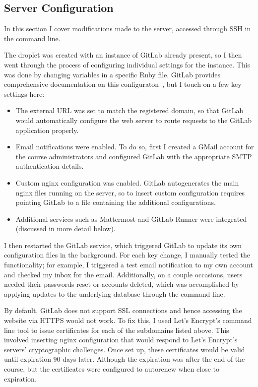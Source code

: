 \documentclass[12pt,twoside]{mitthesis}
\newcommand{\draft}[1]{{\color{blue} #1}}
\begin{document}
\subsection{Server Configuration}

\draft{In this section I cover modifications made to the server, accessed through SSH in the command line.

The droplet was created with an instance of GitLab already present, so I then went through the process of configuring individual settings for the instance. This was done by changing variables in a specific Ruby file. GitLab provides comprehensive documentation on this configuraton~\cite{gitlabdocs}, but I touch on a few key settings here:
\begin{itemize}
\item The external URL was set to match the registered domain, so that GitLab would automatically configure the web server to route requests to the GitLab application properly.
\item Email notifications were enabled. To do so, first I created a GMail account for the course administrators and configured GitLab with the appropriate SMTP authentication details. 
\item Custom nginx configuration was enabled. GitLab autogenerates the main nginx files running on the server, so to insert custom configuration requires pointing GitLab to a file containing the additional configurations.
\item Additional services such as Mattermost and GitLab Runner were integrated (discussed in more detail below).
\end{itemize}
I then restarted the GitLab service, which triggered GitLab to update its own configuration files in the background. For each key change, I manually tested the functionality; for example, I triggered a test email notification to my own account and checked my inbox for the email. Additionally, on a couple occasions, users needed their passwords reset or accounts deleted, which was accomplished by applying updates to the underlying database through the command line.

By default, GitLab does not support SSL connections and hence accessing the website via HTTPS would not work. To fix this, I used Let's Encrypt's command line tool to issue certificates for each of the subdomains listed above. This involved inserting nginx configuration that would respond to Let's Encrypt's servers' cryptographic challenges. Once set up, these certificates would be valid until expiration 90 days later. Although the expiration was after the end of the course, but the certificates were configured to autorenew when close to expiration. 

}
\end{document}
